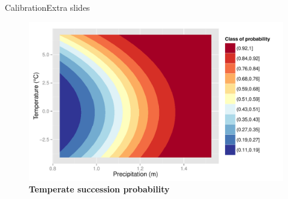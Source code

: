 \documentclass[10pt,aspectratio=149]{beamer}
\begin{document}
\begin{frame}{Calibration}{Extra slides}

            \begin{figure}
              \caption*{\small \textbf{Temperate succession probability}}	
	          \includegraphics[width=0.8\linewidth]{Figs/alphat.pdf}
	        \end{figure}

\end{frame}
\end{document}
